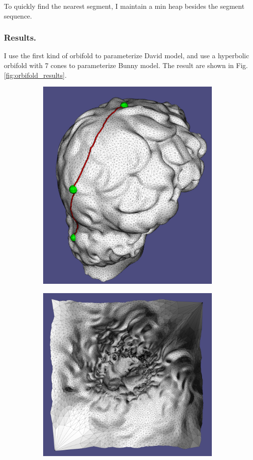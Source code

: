 To quickly find the nearest segment, I maintain a min heap besides the segment sequence.


\subsubsection{Results.}
I use the first kind of orbifold to parameterize David model, and use a hyperbolic orbifold with 7 cones to parameterize Bunny model. The result are shown in Fig.\ref{fig:orbifold_results}.

\begin{figure}
\begin{subfigure}{0.3\textwidth}
\includegraphics[height=\textwidth]{images/david_euc}
\caption{}
\end{subfigure}
\begin{subfigure}{0.3\textwidth}
\includegraphics[height=\textwidth]{images/david_euc_emb}

\end{subfigure}
\end{figure}
